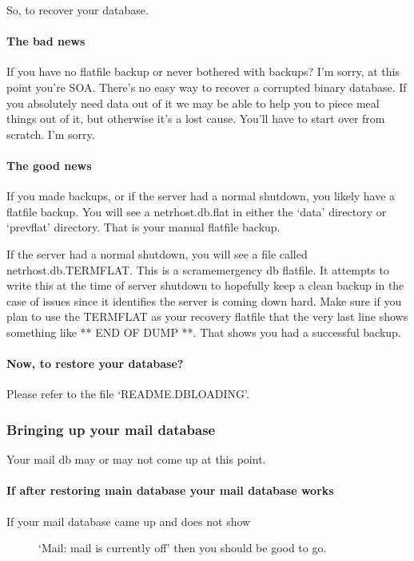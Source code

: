 \documentclass[letterpaper,10pt,english]{sphinxmanual}
\begin{document}
\sphinxAtStartPar
So, to recover your database.


\paragraph{The bad news}
\label{\detokenize{troubleshooting:the-bad-news}}
\sphinxAtStartPar
If you have no flatfile backup or never bothered with backups?
I’m sorry, at this point you’re SOA.  There’s no easy way to
recover a corrupted binary database.  If you absolutely need
data out of it we may be able to help you to piece meal things
out of it, but otherwise it’s a lost cause.  You’ll have to start
over from scratch.  I’m sorry.


\paragraph{The good news}
\label{\detokenize{troubleshooting:the-good-news}}
\sphinxAtStartPar
If you made backups, or if the server had a normal shutdown, you
likely have a flatfile backup.  You will see a netrhost.db.flat
in either the ‘data’ directory or ‘prevflat’ directory.  That
is your manual flatfile backup.

\sphinxAtStartPar
If the server had a normal shutdown, you will see a file called
netrhost.db.TERMFLAT.  This is a scram\sphinxhyphen{}emergency db flatfile.
It attempts to write this at the time of server shutdown to
hopefully keep a clean backup in the case of issues since
it identifies the server is coming down hard.  Make sure
if you plan to use the TERMFLAT as your recovery flatfile
that the very last line shows something like ** END OF DUMP **.
That shows you had a successful backup.


\paragraph{Now, to restore your database?}
\label{\detokenize{troubleshooting:now-to-restore-your-database}}
\sphinxAtStartPar
Please refer to the file ‘README.DBLOADING’.


\subsubsection{Bringing up your mail database}
\label{\detokenize{troubleshooting:bringing-up-your-mail-database}}
\sphinxAtStartPar
Your mail db may or may not come up at this point.


\paragraph{If after restoring main database your mail database works}
\label{\detokenize{troubleshooting:if-after-restoring-main-database-your-mail-database-works}}\begin{description}
\item[{If your mail database came up and does not show}] \leavevmode
\sphinxAtStartPar
‘Mail: mail is currently off’ then you should be good to go.

\end{description}
\end{document}
